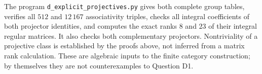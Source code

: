 \begin{remark}\label{D:projector-check}
The program \texttt{d\_explicit\_projectives.py} gives both complete group
tables, verifies all $512$ and $12\,167$ associativity triples, checks
all integral coefficients of both projector identities, and computes
the exact ranks $8$ and $23$ of their integral regular matrices.
It also checks both complementary projectors. Nontriviality of a
projective class is established by the proofs above, not inferred from
a matrix rank calculation. These are algebraic inputs to the finite
category construction; by themselves they are not counterexamples to
Question D1.
\end{remark}
